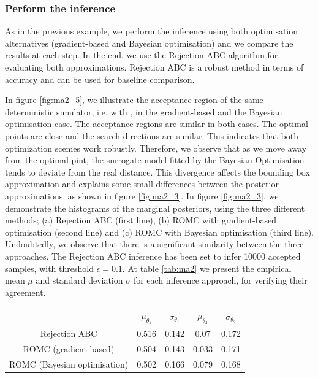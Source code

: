 \subsubsection*{Perform the inference}

As in the previous example, we perform the inference using both
optimisation alternatives (gradient-based and Bayesian optimisation)
and we compare the results at each step. In the end, we use the
Rejection ABC algorithm for evaluating both approximations. Rejection
ABC is a robust method in terms of accuracy and can be used for
baseline comparison.

In figure \ref{fig:ma2_5}, we illustrate the acceptance region of the
same deterministic simulator, i.e. with , in the
gradient-based and the Bayesian optimisation case. The acceptance
regions are similar in both cases. The optimal points are close and
the search directions are similar. This indicates that both
optimization scemes work robustly. Therefore, we observe that as we
move away from the optimal pint, the surrogate model fitted by the
Bayesian Optimisation tends to deviate from the real distance. This
divergence affects the bounding box approximation and explains some
small differences between the posterior approximations, as shown in
figure \ref{fig:ma2_3}. In figure \ref{fig:ma2_3}, we demonstrate the
histograms of the marginal posteriors, using the three different
methods; (a) Rejection ABC (first line), (b) ROMC with gradient-based
optimisation (second line) and (c) ROMC with Bayesian optimisation
(third line). Undoubtedly, we observe that there is a significant
similarity between the three approaches. The Rejection ABC inference
has been set to infer 10000 accepted samples, with threshold
$\epsilon=0.1$. At table \ref{tab:ma2} we present the empirical mean
$\mu$ and standard deviation $\sigma$ for each inference approach, for
verifying their agreement.

\begin{center} \label{tab:ma2}
\begin{tabular}{ c|c|c|c|c }
\hline
& $\mu_{\theta_1}$ & $\sigma_{\theta_1}$ & $\mu_{\theta_2}$ & $\sigma_{\theta_2}$ \\
\hline \hline
Rejection ABC & 0.516 & 0.142 & 0.07 & 0.172 \\
\hline
ROMC (gradient-based) & 0.504 & 0.143 & 0.033 & 0.171 \\
\hline
ROMC (Bayesian optimisation) & 0.502 & 0.166 & 0.079 & 0.168 \\
\hline
\end{tabular}
\end{center}

